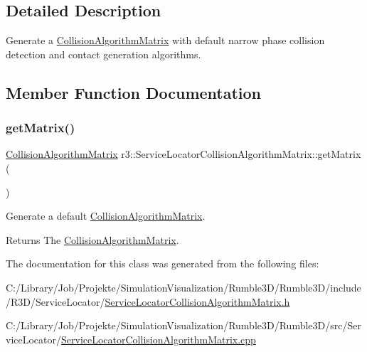 \subsection{Detailed Description}
Generate a \mbox{\hyperlink{classr3_1_1_collision_algorithm_matrix}{Collision\+Algorithm\+Matrix}} with default narrow phase collision detection and contact generation algorithms. 

\subsection{Member Function Documentation}
\mbox{\label{classr3_1_1_service_locator_collision_algorithm_matrix_a3616f828528161b552f5c3bc5dc6aa65}} 
\subsubsection{\texorpdfstring{get\+Matrix()}{getMatrix()}}
{\footnotesize\ttfamily \mbox{\hyperlink{classr3_1_1_collision_algorithm_matrix}{Collision\+Algorithm\+Matrix}} r3\+::\+Service\+Locator\+Collision\+Algorithm\+Matrix\+::get\+Matrix (\begin{DoxyParamCaption}{ }\end{DoxyParamCaption})\hspace{0.3cm}{\ttfamily [static]}}



Generate a default \mbox{\hyperlink{classr3_1_1_collision_algorithm_matrix}{Collision\+Algorithm\+Matrix}}. 

\begin{DoxyReturn}{Returns}
The \mbox{\hyperlink{classr3_1_1_collision_algorithm_matrix}{Collision\+Algorithm\+Matrix}}. 
\end{DoxyReturn}


The documentation for this class was generated from the following files\+:\begin{DoxyCompactItemize}
\item 
C\+:/\+Library/\+Job/\+Projekte/\+Simulation\+Visualization/\+Rumble3\+D/\+Rumble3\+D/include/\+R3\+D/\+Service\+Locator/\mbox{\hyperlink{_service_locator_collision_algorithm_matrix_8h}{Service\+Locator\+Collision\+Algorithm\+Matrix.\+h}}\item 
C\+:/\+Library/\+Job/\+Projekte/\+Simulation\+Visualization/\+Rumble3\+D/\+Rumble3\+D/src/\+Service\+Locator/\mbox{\hyperlink{_service_locator_collision_algorithm_matrix_8cpp}{Service\+Locator\+Collision\+Algorithm\+Matrix.\+cpp}}\end{DoxyCompactItemize}
